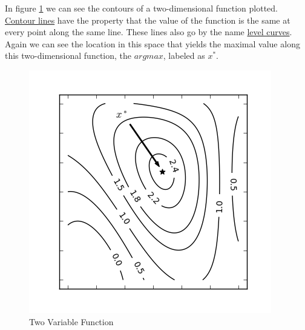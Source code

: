 \documentclass[a4paper, 12pt]{article}
\begin{document}
\vspace{1pc}

In figure \ref{fig:two} we can see the contours of a two-dimensional function plotted. \underline{Contour lines} have the property that the value of the function is the same at every point along the same line. These lines also go by the name \underline{level curves}. Again we can see the location in this space that yields the maximal value along this two-dimensional function, the $argmax$, labeled as $x^*$.

\begin{figure}[H]
  \centering
    \includegraphics[scale=1]{images/two_var.png}
  \caption{Two Variable Function} \label{fig:two}
\end{figure}
\end{document}
